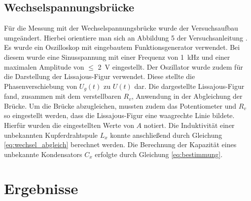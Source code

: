\documentclass[a4paper,usenatbib]{aspdoc}
\begin{document}
        \subsection{Wechselspannungsbrücke}\label{subsec:experiment_wechsel}
            Für die Messung mit der Wechselspannungsbrücke wurde der Versuchsaufbau umgeändert. Hierbei orientiere man sich an Abbildung 5 der Versuchsanleitung \citep{anleitung}. Es wurde ein Oszilloskop mit eingebautem Funktionsgenerator verwendet. Bei diesem wurde eine Sinusspannung mit einer Frequenz von \SI{1}{\kilo\hertz} und einer maximalen Amplitude von $\leq$ \SI{2}{\volt} eingestellt. Der Oszillator wurde zudem für die Darstellung der Lissajous-Figur verwendet. Diese stellte die Phasenverschiebung von $U_g(t)$ zu $U(t)$ dar. Die dargestellte Lissajous-Figur fand, zusammen mit dem verstellbaren $R_v$, Anwendung in der Abgleichung der Brücke. Um die Brücke abzugleichen, mussten zudem das Potentiometer und $R_v$ so eingestellt werden, dass die Lissajous-Figur eine waagrechte Linie bildete. Hierfür wurden die eingestellten Werte von $A$ notiert. Die Induktivität einer unbekannten Kupferdrahtspule $L_x$ konnte anschließend durch Gleichung \ref{eq:wechsel_abgleich} berechnet werden. Die Berechnung der Kapazität eines unbekannte Kondensators $C_x$ erfolgte durch Gleichung \ref{eq:bestimmung}.
       
            
    
    \section{Ergebnisse}\label{sec:result}
        
\end{document}
